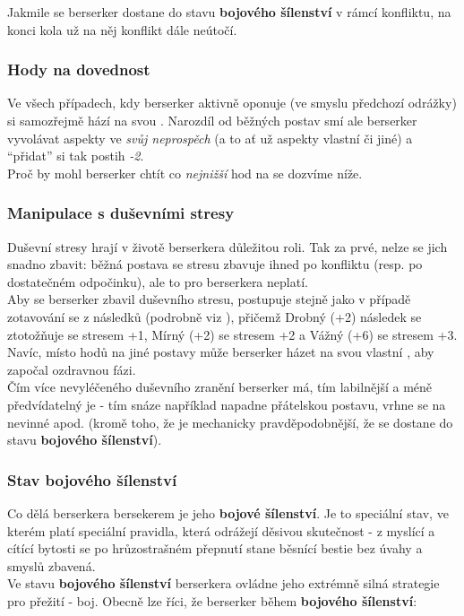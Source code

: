 \documentclass[../main.tex]{subfiles}
\begin{document}
Jakmile se berserker dostane do stavu \textbf{bojového šílenství} v rámcí konfliktu, na konci kola už na něj konflikt dále neútočí.
\subsubsection*{Hody na dovednost }
Ve všech případech, kdy berserker aktivně oponuje    (ve smyslu předchozí odrážky) si samozřejmě hází na  svou . Narozdíl od běžných postav smí ale berserker vyvolávat aspekty ve \textit{svůj neprospěch} (a to ať už aspekty vlastní či jiné) a ``přidat'' si tak postih \textit{-2}. \\
Proč by mohl berserker chtít co \textit{nejnižší} hod na  se dozvíme níže.

\subsubsection*{Manipulace s duševními stresy}
Duševní stresy hrají v životě berserkera důležitou roli. Tak za prvé, nelze se jich snadno zbavit: běžná postava se stresu zbavuje ihned po konfliktu (resp. po dostatečném odpočinku), ale to pro berserkera neplatí. \\
Aby se berserker zbavil duševního stresu, postupuje stejně jako v případě zotavování se z následků (podrobně viz ), přičemž Drobný (+2) následek se ztotožňuje se stresem +1, Mírný (+2) se stresem +2 a Vážný (+6) se stresem +3. Navíc, místo hodů na  jiné postavy může berserker házet na svou vlastní , aby započal ozdravnou fázi.\\
Čím více nevyléčeného duševního zranění berserker má, tím labilnější a méně předvídatelný je - tím snáze například napadne přátelskou postavu, vrhne se na nevinné apod. (kromě toho, že je mechanicky pravděpodobnější, že se dostane do stavu \textbf{bojového šílenství}).

\subsubsection*{Stav bojového šílenství}
Co dělá berserkera bersekerem je jeho \textbf{bojové šílenství}. Je to speciální stav, ve kterém platí speciální pravidla, která odrážejí děsivou skutečnost - z myslící a cítící bytosti se po hrůzostrašném přepnutí stane běsnící bestie bez úvahy a smyslů zbavená. \\
Ve stavu \textbf{bojového šílenství} berserkera ovládne jeho extrémně silná strategie pro přežití - boj. Obecně lze říci, že berserker během \textbf{bojového šílenství}:
\end{document}
